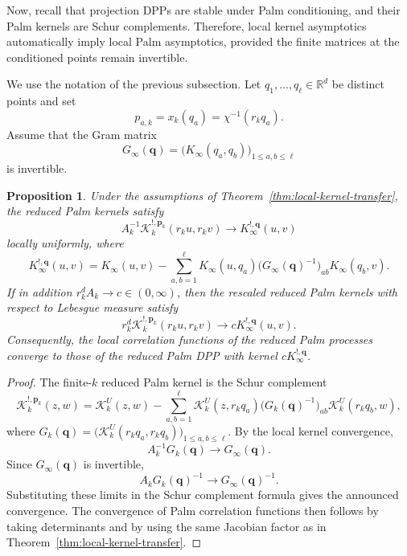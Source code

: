 \documentclass[12pt,a4paper,reqno]{article}
\theoremstyle{thmstyleone}
\newtheorem{proposition}[theorem]{Proposition}
\theoremstyle{thmstylethree}
\theoremstyle{thmstyletwo}
\newtheorem{remark}[theorem]{Remark}
\numberwithin{equation}{subsection}
\def\leq{\leqslant}
\begin{document}



Now, recall that projection DPPs are stable under Palm conditioning, and their Palm kernels are Schur complements. Therefore, local kernel asymptotics automatically imply local Palm asymptotics, provided the finite matrices at the conditioned points remain invertible.

We use the notation of the previous subsection. Let $q_1,\ldots,q_\ell\in\mathbb R^d$ be distinct points and set
\[
    p_{a,k}=x_k(q_a)=\chi^{-1}(r_kq_a).
\]
Assume that the Gram matrix
\[
    G_\infty(\mathbf q)
    =
    \big(K_\infty(q_a,q_b)\big)_{1\leq a,b\leq \ell}
\]
is invertible.

\begin{proposition}\label{prop:palm-transfer}
Under the assumptions of Theorem~\ref{thm:local-kernel-transfer}, the reduced Palm kernels satisfy
\[
    A_k^{-1}
    \mathcal K_k^{!,\mathbf p_k}(r_ku,r_kv)
    \longrightarrow
    K_\infty^{!,\mathbf q}(u,v)
\]
locally uniformly, where
\[
    K_\infty^{!,\mathbf q}(u,v)
    =
    K_\infty(u,v)
    -
    \sum_{a,b=1}^{\ell}
    K_\infty(u,q_a)
    \big(G_\infty(\mathbf q)^{-1}\big)_{ab}
    K_\infty(q_b,v).
\]
If in addition $r_k^dA_k\to c\in(0,\infty)$, then the rescaled reduced Palm kernels with respect to Lebesgue measure satisfy
\[
    r_k^d\mathcal K_k^{!,\mathbf p_k}(r_ku,r_kv)
    \longrightarrow
    cK_\infty^{!,\mathbf q}(u,v).
\]
Consequently, the local correlation functions of the reduced Palm processes converge to those of the reduced Palm DPP with kernel $cK_\infty^{!,\mathbf q}$.
\end{proposition}

\begin{proof}
The finite-$k$ reduced Palm kernel is the Schur complement
\[
    \mathcal K_k^{!,\mathbf p_k}(z,w)
    =
    \mathcal K_k^U(z,w)
    -
    \sum_{a,b=1}^{\ell}
    \mathcal K_k^U(z,r_kq_a)
    \big(G_k(\mathbf q)^{-1}\big)_{ab}
    \mathcal K_k^U(r_kq_b,w),
\]
where $G_k(\mathbf q)=\big(\mathcal K_k^U(r_kq_a,r_kq_b)\big)_{1\leq a,b\leq \ell}.$ By the local kernel convergence,
\[
    A_k^{-1}G_k(\mathbf q)\longrightarrow G_\infty(\mathbf q).
\]
Since $G_\infty(\mathbf q)$ is invertible,
\[
    A_kG_k(\mathbf q)^{-1}\longrightarrow G_\infty(\mathbf q)^{-1}.
\]
Substituting these limits in the Schur complement formula gives the announced convergence. The convergence of Palm correlation functions then follows by taking determinants and by using the same Jacobian factor as in Theorem~\ref{thm:local-kernel-transfer}.
\end{proof}
\end{document}
